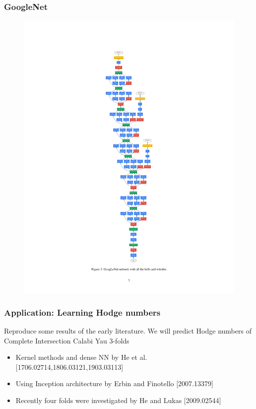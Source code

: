 \documentclass{beamer}
\begin{document}
\begin{frame}
\frametitle{GoogleNet}
\begin{figure}
	\centering
	\includegraphics[scale=0.28]{googlenet.pdf}
\end{figure}
\end{frame}

\begin{frame}
\frametitle{Application: Learning Hodge numbers}
Reproduce some results of the early literature. We will predict Hodge numbers of Complete Intersection Calabi Yau 3-folds
\begin{itemize}
	\item Kernel methods and dense NN by He et al. {\color{blue}[1706.02714,1806.03121,1903.03113]}
	\item Using Inception architecture by Erbin and Finotello {\color{blue}[2007.13379]}
	\item Recently four folds were investigated by He and Lukas {\color{blue}[2009.02544]}
\end{itemize}
\end{frame}
\end{document}
